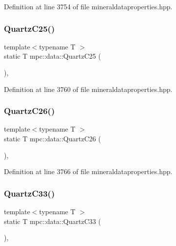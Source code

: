Definition at line 3754 of file mineraldataproperties.\+hpp.

\mbox{\label{namespacempc_1_1data_a93fa72541df2415317eab5443cc726b1}} 
\subsubsection{\texorpdfstring{Quartz\+C25()}{QuartzC25()}}
{\footnotesize\ttfamily template$<$typename T $>$ \\
static T mpc\+::data\+::\+Quartz\+C25 (\begin{DoxyParamCaption}{ }\end{DoxyParamCaption})\hspace{0.3cm}{\ttfamily [inline]}, {\ttfamily [static]}}



Definition at line 3760 of file mineraldataproperties.\+hpp.

\mbox{\label{namespacempc_1_1data_a10171fdf3dd221b514c406c3d84aeffe}} 
\subsubsection{\texorpdfstring{Quartz\+C26()}{QuartzC26()}}
{\footnotesize\ttfamily template$<$typename T $>$ \\
static T mpc\+::data\+::\+Quartz\+C26 (\begin{DoxyParamCaption}{ }\end{DoxyParamCaption})\hspace{0.3cm}{\ttfamily [inline]}, {\ttfamily [static]}}



Definition at line 3766 of file mineraldataproperties.\+hpp.

\mbox{\label{namespacempc_1_1data_a36a7547f9901cc8e4b8c251f2fd8cd09}} 
\subsubsection{\texorpdfstring{Quartz\+C33()}{QuartzC33()}}
{\footnotesize\ttfamily template$<$typename T $>$ \\
static T mpc\+::data\+::\+Quartz\+C33 (\begin{DoxyParamCaption}{ }\end{DoxyParamCaption})\hspace{0.3cm}{\ttfamily [inline]}, {\ttfamily [static]}}




